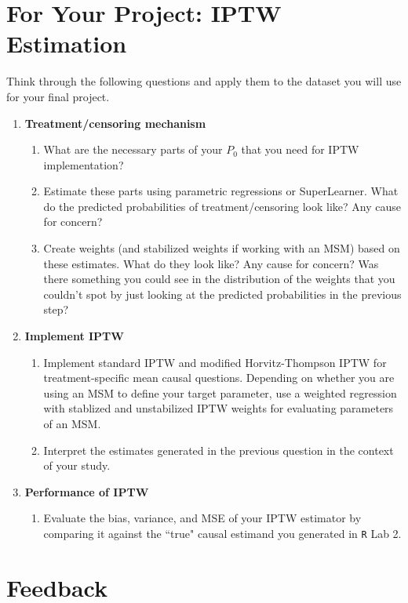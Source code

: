 \documentclass[answers]{exam}
\begin{document}
\pagebreak
\section{For Your Project: IPTW Estimation}

Think through the following questions and apply them to the dataset you will use for your final project.

\begin{enumerate}
\item \textbf{Treatment/censoring mechanism}
\begin{enumerate}
\item What are the necessary parts of your $P_0$ that you need for IPTW implementation?
\item Estimate these parts using parametric regressions or SuperLearner. What do the predicted probabilities of treatment/censoring look like? Any cause for concern?
\item Create weights (and stabilized weights if working with an MSM) based on these estimates. What do they look like? Any cause for concern? Was there something you could see in the distribution of the weights that you couldn't spot by just looking at the predicted probabilities in the previous step?
\end{enumerate}
\item \textbf{Implement IPTW}
\begin{enumerate}
\item Implement standard IPTW and modified Horvitz-Thompson IPTW for treatment-specific mean causal questions. Depending on whether you are using an MSM to define your target parameter, use a weighted regression with stablized and unstabilized IPTW weights for evaluating parameters of an MSM.
\item Interpret the estimates generated in the previous question in the context of your study.
\end{enumerate}
\item \textbf{Performance of IPTW}
\begin{enumerate}
\item Evaluate the bias, variance, and MSE of your IPTW estimator by comparing it against the ``true" causal estimand you generated in \texttt{R} Lab 2.
\end{enumerate}
\end{enumerate}

\pagebreak

\section{Feedback}
\end{document}
